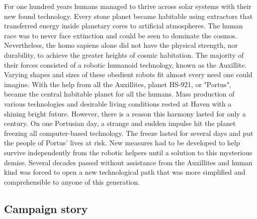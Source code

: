 \documentclass[../Main.tex]{subfiles}
\begin{document}
For one hundred years humans managed to thrive across solar systems with their new found technology. Every stone planet became habitable using extractors that transferred energy inside planetary cores to artificial atmospheres. The human race was to never face extinction and could be seen to dominate the cosmos. Nevertheless, the homo sapiens alone did not have the physical strength, nor durability, to achieve the greater heights of cosmic habitation. The majority of their forces consisted of a robotic humanoid technology, known as the Auxillite. Varying shapes and sizes of these obedient robots fit almost every need one could imagine. With the help from all the Auxillites, planet HS-921, or "Portus", became the central habitable planet for all the humans. Mass production of various technologies and desirable living conditions rested at Haven with a shining bright future. However, there is a reason this harmony lasted for only a century. On one Portusian day, a strange and sudden impulse hit the planet freezing all computer-based technology. The freeze lasted for several days and put the people of Portus' lives at risk. New measures had to be developed to help survive independently from the robotic helpers until a solution to this mysterious demise. Several decades passed without assistance from the Auxillites and human kind was forced to open a new technological path that was more simplified and comprehensible to anyone of this generation. 

\subsection{Campaign story}
\end{document}
